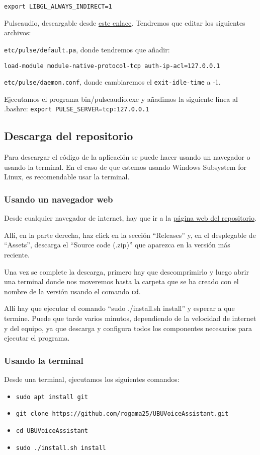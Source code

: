 \texttt{export LIBGL\_ALWAYS\_INDIRECT=1}

Pulseaudio, descargable desde \href{https://www.freedesktop.org/wiki/Software/PulseAudio/Ports/Windows/Support/}{este enlace}. Tendremos que editar los siguientes archivos:

\texttt{etc/pulse/default.pa}, donde tendremos que añadir:

\texttt{load-module module-native-protocol-tcp auth-ip-acl=127.0.0.1}

\texttt{etc/pulse/daemon.conf}, donde cambiaremos el \texttt{exit-idle-time} a -1.

Ejecutamos el programa bin/pulseaudio.exe y añadimos la siguiente línea al .bashrc:
\texttt{export PULSE\_SERVER=tcp:127.0.0.1}

\subsection{Descarga del repositorio}
Para descargar el código de la aplicación se puede hacer usando un navegador o usando la terminal. En el caso de que estemos usando Windows Subsystem for Linux, es recomendable usar la terminal.

\subsubsection{Usando un navegador web}
Desde cualquier navegador de internet, hay que ir a la \href{https://github.com/rogama25/UBUVoiceAssistant}{página web del repositorio}.

Allí, en la parte derecha, haz click en la sección ``Releases'' y, en el desplegable de ``Assets'', descarga el ``Source code (.zip)'' que aparezca en la versión más reciente.

Una vez se complete la descarga, primero hay que descomprimirlo y luego abrir una terminal donde nos moveremos hasta la carpeta que se ha creado con el nombre de la versión usando el comando \texttt{cd}.

Allí hay que ejecutar el comando ``sudo ./install.sh install'' y esperar a que termine. Puede que tarde varios minutos, dependiendo de la velocidad de internet y del equipo, ya que descarga y configura todos los componentes necesarios para ejecutar el programa.

\subsubsection{Usando la terminal}
Desde una terminal, ejecutamos los siguientes comandos:
\begin{itemize}
    \item \texttt{sudo apt install git}
    \item \texttt{git clone https://github.com/rogama25/UBUVoiceAssistant.git}
    \item \texttt{cd UBUVoiceAssistant}
    \item \texttt{sudo ./install.sh install}
\end{itemize}

